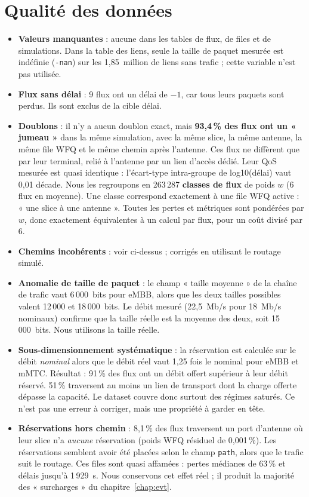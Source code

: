 \documentclass[11pt,a4paper]{report}
\begin{document}
\section{Qualité des données}
\begin{itemize}
  \item \textbf{Valeurs manquantes} : aucune dans les tables de flux, de files et de simulations. Dans la table des liens, seule la taille de paquet mesurée est indéfinie (\texttt{-nan}) sur les 1,85~million de liens sans trafic ; cette variable n'est pas utilisée.
  \item \textbf{Flux sans délai} : 9 flux ont un délai de $-1$, car tous leurs paquets sont perdus. Ils sont exclus de la cible délai.
  \item \textbf{Doublons} : il n'y a aucun doublon exact, mais \textbf{93,4\,\% des flux ont un « jumeau »} dans la même simulation, avec la même slice, la même antenne, la même file WFQ et le même chemin après l'antenne. Ces flux ne diffèrent que par leur terminal, relié à l'antenne par un lien d'accès dédié. Leur QoS mesurée est quasi identique : l'écart-type intra-groupe de log10(délai) vaut 0,01 décade. Nous les regroupons en 263\,287 \textbf{classes de flux} de poids $w$ (6 flux en moyenne). Une classe correspond exactement à une file WFQ active : « une slice à une antenne ». Toutes les pertes et métriques sont pondérées par $w$, donc exactement équivalentes à un calcul par flux, pour un coût divisé par 6.
  \item \textbf{Chemins incohérents} : voir ci-dessus ; corrigés en utilisant le routage simulé.
  \item \textbf{Anomalie de taille de paquet} : le champ « taille moyenne » de la chaîne de trafic vaut 6\,000~bits pour eMBB, alors que les deux tailles possibles valent 12\,000 et 18\,000~bits. Le débit mesuré (22,5~Mb/s pour 18~Mb/s nominaux) confirme que la taille réelle est la moyenne des deux, soit 15\,000~bits. Nous utilisons la taille réelle.
  \item \textbf{Sous-dimensionnement systématique} : la réservation est calculée sur le débit \emph{nominal} alors que le débit réel vaut 1,25 fois le nominal pour eMBB et mMTC. Résultat : 91\,\% des flux ont un débit offert supérieur à leur débit réservé. 51\,\% traversent au moins un lien de transport dont la charge offerte dépasse la capacité. Le dataset couvre donc surtout des régimes saturés. Ce n'est pas une erreur à corriger, mais une propriété à garder en tête.
  \item \textbf{Réservations hors chemin} : 8,1\,\% des flux traversent un port d'antenne où leur slice n'a \emph{aucune} réservation (poids WFQ résiduel de 0,001\,\%). Les réservations semblent avoir été placées selon le champ \texttt{path}, alors que le trafic suit le routage. Ces files sont quasi affamées : pertes médianes de 63\,\% et délais jusqu'à 1\,929~s. Nous conservons cet effet réel ; il produit la majorité des « surcharges » du chapitre~\ref{chap:evt}.

\end{itemize}
\end{document}

